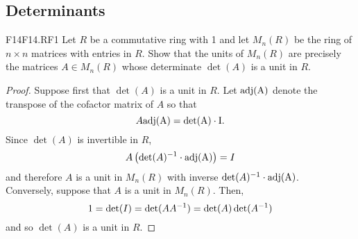 \documentclass[../../AlgebraQualSolutions.tex]{subfiles}
\begin{document}
\subsection{Determinants}

\begin{prob}{F14}{F14.RF1}
	Let $R$ be a commutative ring with 1 and let $M_n(R)$ be the ring of $n \times n$ matrices with entries in $R$. Show that the units of $M_n(R)$ are precisely the matrices $A \in M_n(R)$ whose determinate $\det(A)$ is a unit in $R$.
\end{prob}

\begin{proof}
	Suppose first that $\det(A)$ is a unit in $R$. Let $\rm{adj}(A)$ denote the transpose of the cofactor matrix of $A$ so that
		\[A \rm{adj}(A) = \det(A) \cdot I. \]
	Since $\det(A)$ is invertible in $R$,
		\[A\left(\det(A)^{-1} \cdot \rm{adj}(A)\right) = I\]
	and therefore $A$ is a unit in $M_n(R)$ with inverse $\det(A)^{-1} \cdot \rm{adj}(A)$.\\

	Conversely, suppose that $A$ is a unit in $M_n(R)$. Then,
		\[1 = \det(I) = \det(AA^{-1}) = \det(A)\det(A^{-1})\]
	and so $\det(A)$ is a unit in $R$.
\end{proof}
\end{document}
